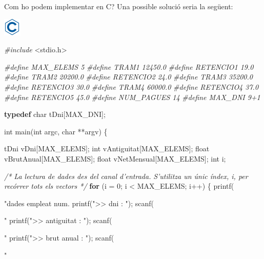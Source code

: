 \documentclass[]{book}
\newenvironment{Shaded}{\begin{snugshade}}{\end{snugshade}}
\newcommand{\KeywordTok}[1]{\textcolor[rgb]{0.13,0.29,0.53}{\textbf{#1}}}
\newcommand{\DataTypeTok}[1]{\textcolor[rgb]{0.13,0.29,0.53}{#1}}
\newcommand{\DecValTok}[1]{\textcolor[rgb]{0.00,0.00,0.81}{#1}}
\newcommand{\SpecialCharTok}[1]{\textcolor[rgb]{0.00,0.00,0.00}{#1}}
\newcommand{\StringTok}[1]{\textcolor[rgb]{0.31,0.60,0.02}{#1}}
\newcommand{\ImportTok}[1]{#1}
\newcommand{\CommentTok}[1]{\textcolor[rgb]{0.56,0.35,0.01}{\textit{#1}}}
\newcommand{\ControlFlowTok}[1]{\textcolor[rgb]{0.13,0.29,0.53}{\textbf{#1}}}
\newcommand{\PreprocessorTok}[1]{\textcolor[rgb]{0.56,0.35,0.01}{\textit{#1}}}
\newcommand{\NormalTok}[1]{#1}
\begin{document}
Com ho podem implementar en C? Una possible solució seria la següent:

\includegraphics{./img/c.png}

\begin{Shaded}
\begin{Highlighting}[]
\PreprocessorTok{#include }\ImportTok{<stdio.h>}

\PreprocessorTok{#define MAX_ELEMS 5}
\PreprocessorTok{#define TRAM1 12450.0}
\PreprocessorTok{#define RETENCIO1 19.0}
\PreprocessorTok{#define TRAM2 20200.0}
\PreprocessorTok{#define RETENCIO2 24.0}
\PreprocessorTok{#define TRAM3 35200.0}
\PreprocessorTok{#define RETENCIO3 30.0}
\PreprocessorTok{#define TRAM4 60000.0}
\PreprocessorTok{#define RETENCIO4 37.0}
\PreprocessorTok{#define RETENCIO5 45.0}
\PreprocessorTok{#define NUM_PAGUES 14}
\PreprocessorTok{#define MAX_DNI 9+1}

\KeywordTok{typedef} \DataTypeTok{char}\NormalTok{ tDni[MAX_DNI];}

\DataTypeTok{int}\NormalTok{ main(}\DataTypeTok{int}\NormalTok{ argc, }\DataTypeTok{char}\NormalTok{ **argv) \{}

\NormalTok{    tDni vDni[MAX_ELEMS];}
    \DataTypeTok{int}\NormalTok{ vAntiguitat[MAX_ELEMS];}
    \DataTypeTok{float}\NormalTok{ vBrutAnual[MAX_ELEMS];}
    \DataTypeTok{float}\NormalTok{ vNetMensual[MAX_ELEMS];}
    \DataTypeTok{int}\NormalTok{ i;}

    \CommentTok{/* La lectura de dades des del canal d'entrada.}
\CommentTok{       S'utilitza un únic índex, i, per recórrer tots els vectors */}
    \ControlFlowTok{for}\NormalTok{ (i = }\DecValTok{0}\NormalTok{; i < MAX_ELEMS; i++) \{}
\NormalTok{        printf(}\StringTok{"dades empleat num. %
\NormalTok{        printf(}\StringTok{">> dni : "}\NormalTok{);}
\NormalTok{        scanf(}\StringTok{"%
\NormalTok{        printf(}\StringTok{">> antiguitat : "}\NormalTok{);}
\NormalTok{        scanf(}\StringTok{"%
\NormalTok{        printf(}\StringTok{">> brut anual : "}\NormalTok{);}
\NormalTok{        scanf(}\StringTok{"%
        
}}}}
\end{Highlighting}
\end{Shaded}
\end{document}
